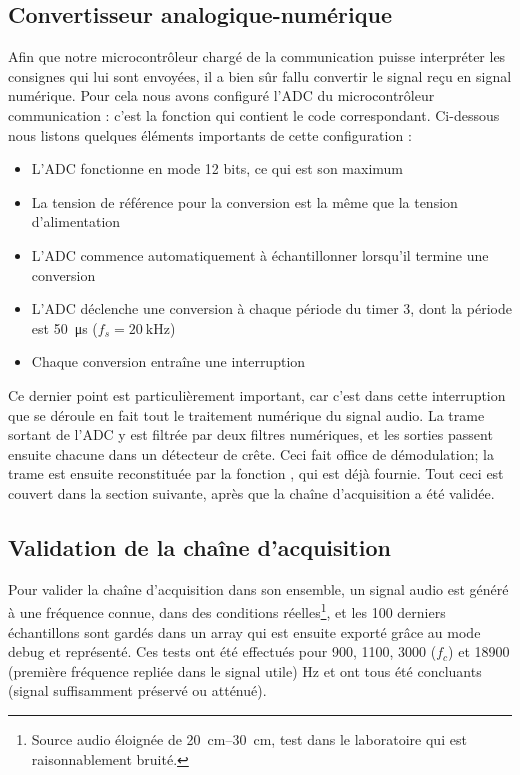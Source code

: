 \subsection{Convertisseur analogique-numérique}
Afin que notre microcontrôleur chargé de la communication puisse interpréter les consignes qui lui sont envoyées, il a bien sûr fallu convertir le signal reçu en signal numérique. Pour cela nous avons configuré l'ADC du microcontrôleur communication : c'est la fonction  qui contient le code correspondant. Ci-dessous nous listons quelques éléments importants de cette configuration :
\begin{itemize}
\item L'ADC fonctionne en mode 12 bits, ce qui est son maximum
\item La tension de référence pour la conversion est la même que la tension d'alimentation
\item L'ADC commence automatiquement à échantillonner lorsqu'il termine une conversion
\item L'ADC déclenche une conversion à chaque période du timer 3, dont la période est \SI{50}{\micro\second} ($f_s = \SI{20}{\kilo\hertz}$)
\item Chaque conversion entraîne une interruption
\end{itemize}
Ce dernier point est particulièrement important, car c'est dans cette interruption que se déroule en fait tout le traitement numérique du signal audio. La trame sortant de l'ADC y est filtrée par deux filtres numériques, et les sorties passent ensuite chacune dans un détecteur de crête. Ceci fait office de démodulation; la trame est ensuite reconstituée par la fonction , qui est déjà fournie. Tout ceci est couvert dans la section suivante, après que la chaîne d'acquisition a été validée.

\subsection{Validation de la chaîne d'acquisition}

Pour valider la chaîne d'acquisition dans son ensemble, un signal audio est généré à une fréquence connue, dans des conditions réelles\footnote{Source audio éloignée de \SIrange{20}{30}{\centi\meter}, test dans le laboratoire qui est raisonnablement bruité.}, et les 100 derniers échantillons sont gardés dans un array qui est ensuite exporté grâce au mode debug et représenté. Ces tests ont été effectués pour 900, 1100, 3000 ($f_c$) et 18900 (première fréquence repliée dans le signal utile) \si{\hertz} et ont tous été concluants (signal suffisamment préservé ou atténué).

